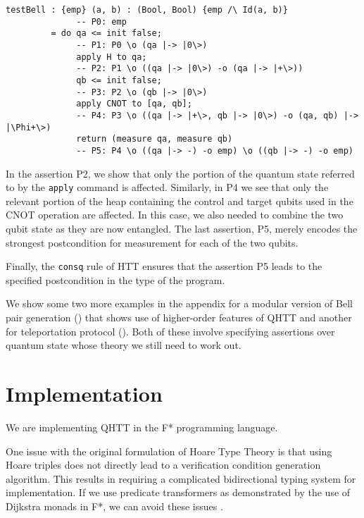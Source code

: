 \documentclass[acmsmall,nonacm,timestamp,review=false,anonymous=false]{acmart}
\begin{document}
\begin{lstlisting}[language=QHaskell]
testBell : {emp} (a, b) : (Bool, Bool) {emp /\ Id(a, b)}
              -- P0: emp
         = do qa <= init false;
              -- P1: P0 \o (qa |-> |0\>)
              apply H to qa;
              -- P2: P1 \o ((qa |-> |0\>) -o (qa |-> |+\>))
              qb <= init false;
              -- P3: P2 \o (qb |-> |0\>)
              apply CNOT to [qa, qb];
              -- P4: P3 \o ((qa |-> |+\>, qb |-> |0\>) -o (qa, qb) |-> |\Phi+\>)
              return (measure qa, measure qb)
              -- P5: P4 \o ((qa |-> -) -o emp) \o ((qb |-> -) -o emp)
\end{lstlisting}

In the assertion P2, we show that only the portion of the quantum state referred to by the \texttt{apply} command is affected. Similarly, in P4 we see that only the relevant portion of the heap containing the control and target qubits used in the CNOT operation are affected. In this case, we also needed to combine the two qubit state as they are now entangled. The last assertion, P5, merely encodes the strongest postcondition for measurement for each of the two qubits.

Finally, the \texttt{consq} rule of HTT ensures that the assertion P5 leads to the specified postcondition in the type of the program.

We show some two more examples in the appendix for a modular version of Bell pair generation () that shows use of higher-order features of QHTT and another for teleportation protocol (). Both of these involve specifying assertions over quantum state whose theory we still need to work out.


\section{Implementation}
We are implementing QHTT in the F* programming language.

One issue with the original formulation of Hoare Type Theory is that using Hoare triples does not directly lead to a verification condition generation algorithm. This results in requiring a complicated bidirectional typing system for implementation. If we use predicate transformers as demonstrated by the use of Dijkstra monads in F*, we can avoid these issues \cite{swamy2013verifying}.
\end{document}
